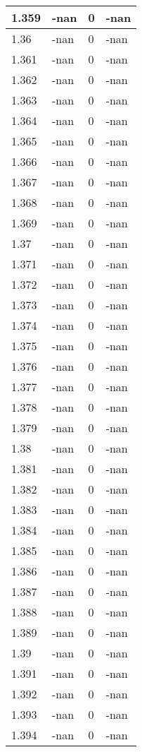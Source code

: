 \documentclass[a4paper,14pt]{extarticle}
\begin{document}
\begin{longtable}{||m{3cm}||m{3cm}|m{3cm}||m{3cm}||}
\hline
1.359 & -nan & 0 & -nan\\
\hline
1.36 & -nan & 0 & -nan\\
\hline
1.361 & -nan & 0 & -nan\\
\hline
1.362 & -nan & 0 & -nan\\
\hline
1.363 & -nan & 0 & -nan\\
\hline
1.364 & -nan & 0 & -nan\\
\hline
1.365 & -nan & 0 & -nan\\
\hline
1.366 & -nan & 0 & -nan\\
\hline
1.367 & -nan & 0 & -nan\\
\hline
1.368 & -nan & 0 & -nan\\
\hline
1.369 & -nan & 0 & -nan\\
\hline
1.37 & -nan & 0 & -nan\\
\hline
1.371 & -nan & 0 & -nan\\
\hline
1.372 & -nan & 0 & -nan\\
\hline
1.373 & -nan & 0 & -nan\\
\hline
1.374 & -nan & 0 & -nan\\
\hline
1.375 & -nan & 0 & -nan\\
\hline
1.376 & -nan & 0 & -nan\\
\hline
1.377 & -nan & 0 & -nan\\
\hline
1.378 & -nan & 0 & -nan\\
\hline
1.379 & -nan & 0 & -nan\\
\hline
1.38 & -nan & 0 & -nan\\
\hline
1.381 & -nan & 0 & -nan\\
\hline
1.382 & -nan & 0 & -nan\\
\hline
1.383 & -nan & 0 & -nan\\
\hline
1.384 & -nan & 0 & -nan\\
\hline
1.385 & -nan & 0 & -nan\\
\hline
1.386 & -nan & 0 & -nan\\
\hline
1.387 & -nan & 0 & -nan\\
\hline
1.388 & -nan & 0 & -nan\\
\hline
1.389 & -nan & 0 & -nan\\
\hline
1.39 & -nan & 0 & -nan\\
\hline
1.391 & -nan & 0 & -nan\\
\hline
1.392 & -nan & 0 & -nan\\
\hline
1.393 & -nan & 0 & -nan\\
\hline
1.394 & -nan & 0 & -nan\\

\end{longtable}
\end{document}
